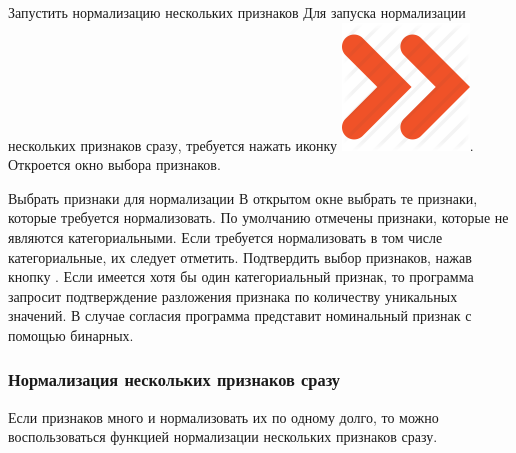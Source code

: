 \documentclass[12pt,tikz]{instruction}
\begin{document}
\newpage
\begin{steps}
	\begin{step}{Запустить нормализацию нескольких признаков}
		Для запуска нормализации нескольких признаков сразу, требуется нажать иконку \includegraphics[scale=0.1]{img2/norm_all.png}. Откроется окно выбора признаков. 	
	\end{step}
	\begin{step}{Выбрать признаки для нормализации}
		В открытом окне выбрать те признаки, которые требуется нормализовать. По умолчанию отмечены признаки, которые не являются категориальными. Если требуется нормализовать в том числе категориальные, их следует отметить. Подтвердить выбор признаков, нажав кнопку . Если имеется хотя бы один категориальный признак, то программа запросит подтверждение разложения признака по количеству уникальных значений. В случае согласия программа представит номинальный признак с помощью бинарных.
	\end{step}
\end{steps}



\newpage
\subsubsection{Нормализация нескольких признаков сразу}

Если признаков много и нормализовать их по одному долго, то можно воспользоваться функцией нормализации нескольких признаков сразу.
\end{document}
